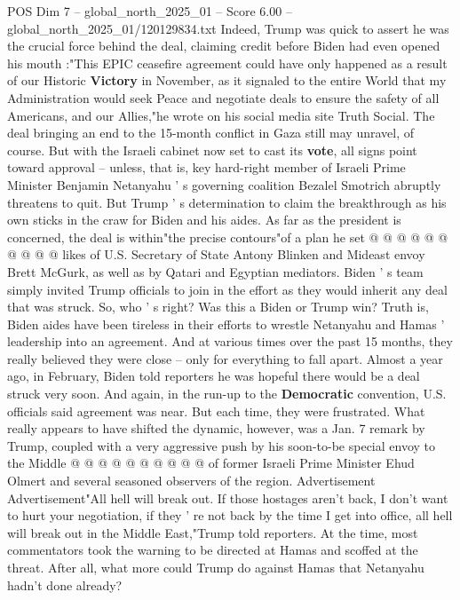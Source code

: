 \begin{textsample}{POS Dim 7 – global\_north\_2025\_01 – Score 6.00 – global\_north\_2025\_01/120129834.txt}  \label{ex:f7_pos_272}
Indeed, Trump was quick to assert he was the crucial force behind the deal, claiming credit before Biden had even opened his mouth :"This EPIC ceasefire agreement could have only happened as a result of our Historic \textbf{Victory} in November, as it signaled to the entire World that my Administration would seek Peace and negotiate deals to ensure the safety of all Americans, and our Allies,"he wrote on his social media site Truth Social.
The deal bringing an end to the 15-month conflict in Gaza still may unravel, of course.
But with the Israeli cabinet now set to cast its \textbf{vote}, all signs point toward approval -- unless, that is, key hard-right member of Israeli Prime Minister Benjamin Netanyahu ' s governing coalition Bezalel Smotrich abruptly threatens to quit.
But Trump ' s determination to claim the breakthrough as his own sticks in the craw for Biden and his aides.
As far as the president is concerned, the deal is within"the precise contours"of a plan he set @ @ @ @ @ @ @ @ @ @ likes of U.S.
Secretary of State Antony Blinken and Mideast envoy Brett McGurk, as well as by Qatari and Egyptian mediators.
Biden ' s team simply invited Trump officials to join in the effort as they would inherit any deal that was struck.
So, who ' s right?
Was this a Biden or Trump win?
Truth is, Biden aides have been tireless in their efforts to wrestle Netanyahu and Hamas ' leadership into an agreement.
And at various times over the past 15 months, they really believed they were close -- only for everything to fall apart.
Almost a year ago, in February, Biden told reporters he was hopeful there would be a deal struck very soon.
And again, in the run-up to the \textbf{Democratic} convention, U.S. officials said agreement was near.
But each time, they were frustrated.
What really appears to have shifted the dynamic, however, was a Jan. 7 remark by Trump, coupled with a very aggressive push by his soon-to-be special envoy to the Middle @ @ @ @ @ @ @ @ @ @ of former Israeli Prime Minister Ehud Olmert and several seasoned observers of the region.
Advertisement Advertisement"All hell will break out.
If those hostages aren't back, I don't want to hurt your negotiation, if they ' re not back by the time I get into office, all hell will break out in the Middle East,"Trump told reporters.
At the time, most commentators took the warning to be directed at Hamas and scoffed at the threat.
After all, what more could Trump do against Hamas that Netanyahu hadn't done already?

\end{textsample}
